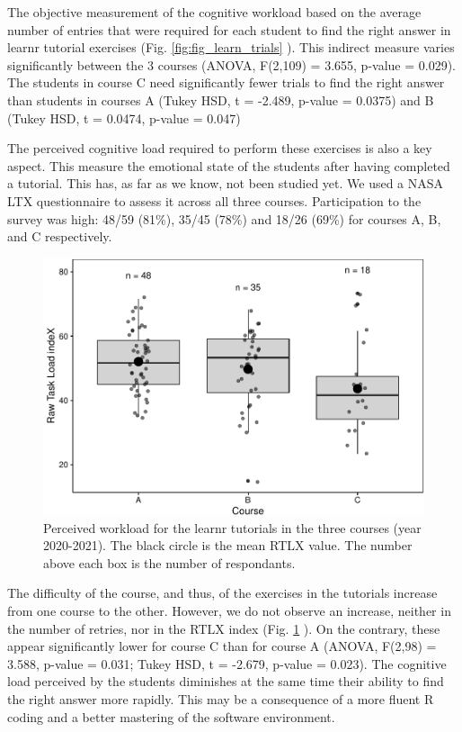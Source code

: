 \documentclass{aims}
\theoremstyle{definition}
\begin{document}
The objective measurement of the cognitive workload based on the average
number of entries that were required for each student to find the right
answer in learnr tutorial exercises (Fig. \ref {fig:fig_learn_trials} ).
This indirect measure varies significantly between the 3 courses (ANOVA,
F(2,109) = 3.655, p-value = 0.029). The students in course C need
significantly fewer trials to find the right answer than students in
courses A (Tukey HSD, t = -2.489, p-value = 0.0375) and B (Tukey HSD, t
= 0.0474, p-value = 0.047)

The perceived cognitive load required to perform these exercises is also
a key aspect. This measure the emotional state of the students after
having completed a tutorial. This has, as far as we know, not been
studied yet. We used a NASA LTX questionnaire to assess it across all
three courses. Participation to the survey was high: 48/59 (81\%), 35/45
(78\%) and 18/26 (69\%) for courses A, B, and C respectively.

\begin{figure}
\includegraphics[width=1\linewidth]{teaching_data_science_files/figure-latex/fig_rtlx-1} \caption{\label{fig:fig_rtlx} Perceived workload for the learnr tutorials in the three courses (year 2020-2021). The black circle is the mean RTLX value. The number above each box is the number of respondants.}\label{fig:fig_rtlx}
\end{figure}

The difficulty of the course, and thus, of the exercises in the
tutorials increase from one course to the other. However, we do not
observe an increase, neither in the number of retries, nor in the RTLX
index (Fig. \ref {fig:fig_rtlx} ). On the contrary, these appear
significantly lower for course C than for course A (ANOVA, F(2,98) =
3.588, p-value = 0.031; Tukey HSD, t = -2.679, p-value = 0.023). The
cognitive load perceived by the students diminishes at the same time
their ability to find the right answer more rapidly. This may be a
consequence of a more fluent R coding and a better mastering of the
software environment.
\end{document}
